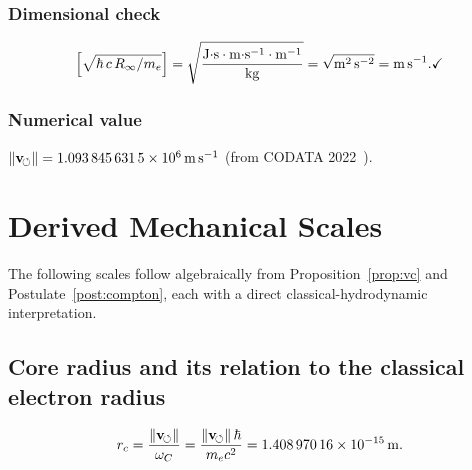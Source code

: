 \documentclass[aps,pra,preprint,longbibliography,nofootinbib]{revtex4-2}
\newcommand{\vnorm}{\lVert\mathbf{v}_{\!\boldsymbol{\circlearrowleft}}\rVert} %
\newcommand{\rc}{r_c}                            %
\newcommand{\omC}{\omega_C}                      %
\newcommand{\Rinf}{R_\infty}                     %
\begin{document}
\subsubsection*{Dimensional check}
\[
  \Bigl[\sqrt{\hbar\,c\,\Rinf/m_e}\Bigr]
  = \sqrt{
      \frac{\mathrm{J{\cdot}s\cdot m{\cdot}s^{-1}\cdot m^{-1}}}
           {\mathrm{kg}}
    }
  = \sqrt{\mathrm{m^2\,s^{-2}}} = \mathrm{m\,s^{-1}}. \checkmark
\]

\subsubsection*{Numerical value}
$\vnorm = \SI{1.093\,845\,631\,5e6}{\meter\per\second}$
\quad(from CODATA 2022~\cite{MohrTaylor2022}).

\section{Derived Mechanical Scales}
\label{sec:derived}

The following scales follow algebraically from
Proposition~\ref{prop:vc} and Postulate~\ref{post:compton},
each with a direct classical-hydrodynamic interpretation.

\subsection{Core radius and its relation to the classical electron radius}
\label{sec:rc}

\begin{equation}
  \rc = \frac{\vnorm}{\omC} = \frac{\vnorm\,\hbar}{m_e c^2}
      = \SI{1.408\,970\,16e-15}{\meter}.
  \label{eq:rc}
\end{equation}
\end{document}
